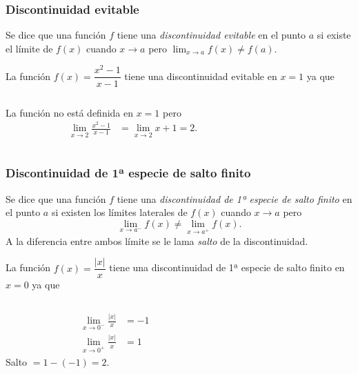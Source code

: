 \begin{frame}
\frametitle{Discontinuidad evitable}
\begin{definicion}
Se dice que una función $f$ tiene una \emph{discontinuidad evitable} en el punto $a$ si
existe el límite de $f(x)$ cuando $x\rightarrow a$ pero $\displaystyle \lim_{x\rightarrow a}f(x)\neq f(a)$.
\end{definicion}

 La función $f(x)=\dfrac{x^2-1}{x-1}$ tiene una discontinuidad evitable en $x=1$ ya que
\begin{columns}
\begin{column}{0.4\textwidth}
La función no está definida en $x=1$ pero
\begin{align*}
\lim_{x\rightarrow 2}\frac{x^2-1}{x-1}&= \lim_{x\rightarrow 2}x+1=2.
\end{align*}
\end{column}
\begin{column}{0.5\textwidth}
\begin{center}
\scalebox{1}{}
\end{center}
\end{column}
\end{columns}


\end{frame}


\begin{frame}
\frametitle{Discontinuidad de 1ª especie de salto finito}
\begin{definicion}
Se dice que una función $f$ tiene una \emph{discontinuidad de 1ª especie de salto finito} en el punto $a$ si existen los límites laterales de $f(x)$ cuando $x\rightarrow a$ pero
\[\lim_{x\rightarrow a^-}f(x)\neq \lim_{x\rightarrow a^+}f(x).\]
A la diferencia entre ambos límite se le lama \emph{salto} de la discontinuidad.
\end{definicion}

 La función $f(x)=\dfrac{|x|}{x}$ tiene una discontinuidad de 1ª especie de salto finito en $x=0$ ya que
\begin{columns}
\begin{column}{0.4\textwidth}
\begin{align*}
\lim_{x\rightarrow 0^-}\frac{|x|}{x}&= -1\\
\lim_{x\rightarrow 0^+}\frac{|x|}{x}&= 1
\end{align*}
Salto $= 1-(-1)=2$.
\end{column}
\begin{column}{0.5\textwidth}
\begin{center}
\scalebox{1}{}
\end{center}
\end{column}
\end{columns}
\end{frame}


